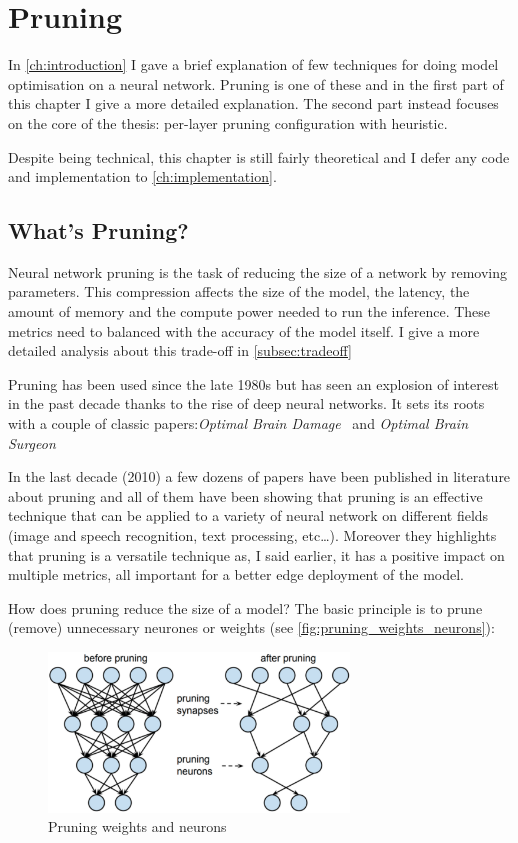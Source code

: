 \chapter{Pruning}\label{ch:pruning}
In \autoref{ch:introduction} I gave a brief explanation of few techniques for
doing model optimisation on a neural network. Pruning is one of these and in
the first part of this chapter I give a more detailed explanation.
The second part instead focuses on the core of the thesis: per-layer pruning
configuration with heuristic.

Despite being technical, this chapter is still fairly theoretical and I defer
any code and implementation to \autoref{ch:implementation}.

\section{What's Pruning?}
Neural network pruning is the task of reducing the size of a network by
removing parameters. This compression affects the size of the model, the
latency, the amount of memory and the compute power needed to run the
inference. These metrics need to balanced with the accuracy of the model
itself. I give a more detailed analysis about this trade-off in
\autoref{subsec:tradeoff}

Pruning has been used since the late 1980s but has seen an explosion of
interest in the past decade thanks to the rise of deep neural networks.
It sets its roots with a couple of classic papers:\textit{Optimal Brain
Damage}~\cite{lecun-90b} and \textit{Optimal Brain Surgeon}\cite{hassibi-93}

In the last decade (2010) a few dozens of papers have been published in
literature about pruning and all of them have been showing that pruning is an
effective technique that can be applied to a variety of neural network on
different fields (image and speech recognition, text processing, etc\ldots).
Moreover they highlights that pruning is a versatile technique as, I said
earlier, it has a positive impact on multiple metrics, all important for a
better edge deployment of the model.

How does pruning reduce the size of a model? The basic principle is to prune
(remove) unnecessary neurones or weights (see \autoref{fig:pruning_weights_neurons}):

\begin{figure}[ht]
    \includegraphics[width=8cm]{images/pruning/pruning_weights_neurons.png}
    \centering
    \caption{Pruning weights and neurons}\label{fig:pruning_weights_neurons}
\end{figure}

